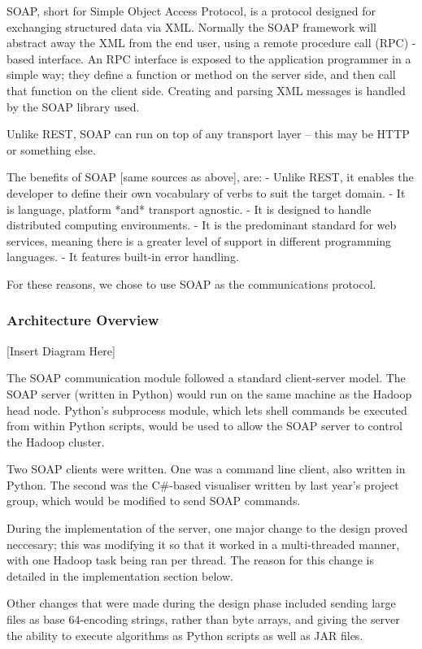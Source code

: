 SOAP, short for Simple Object Access Protocol, is a protocol designed for exchanging structured data via XML. Normally the SOAP framework will abstract away the XML from the end user, using a remote procedure call (RPC) -based interface. An RPC interface is exposed to the application programmer in a simple way; they define a function or method on the server side, and then call that function on the client side. Creating and parsing XML messages is handled by the SOAP library used.

Unlike REST, SOAP can run on top of any transport layer -- this may be HTTP or something else.

The benefits of SOAP [same sources as above], are:
- Unlike REST, it enables the developer to define their own vocabulary of verbs to suit the target domain.
- It is language, platform *and* transport agnostic.
- It is designed to handle distributed computing environments.
- It is the predominant standard for web services, meaning there is a greater level of support in different programming languages.
- It features built-in error handling.

For these reasons, we chose to use SOAP as the communications protocol.

\subsubsection{Architecture Overview}

[Insert Diagram Here]

The SOAP communication module followed a standard client-server model. The SOAP server (written in Python) would run on the same machine as the Hadoop head node. Python's subprocess module, which lets shell commands be executed from within Python scripts, would be used to allow the SOAP server to control the Hadoop cluster.

Two SOAP clients were written. One was a command line client, also written in Python. The second was the C\#-based visualiser written by last year's project group, which would be modified to send SOAP commands.

During the implementation of the server, one major change to the design proved neccesary; this was modifying it so that it worked in a multi-threaded manner, with one Hadoop task being ran per thread. The reason for this change is detailed in the implementation section below.

Other changes that were made during the design phase included sending large files as base 64-encoding strings, rather than byte arrays, and giving the server the ability to execute algorithms as Python scripts as well as JAR files.

